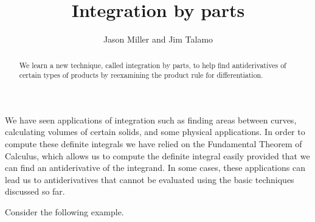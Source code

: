 \documentclass[noauthor]{ximera}
\author{Jason Miller and Jim Talamo}
\title[Dig-In:]{Integration by parts}
\begin{document}
\begin{abstract}
  We learn a new technique, called integration by parts, to help find antiderivatives of certain types of products by reexamining the product rule for differentiation.
\end{abstract}
\maketitle

We have seen applications of integration such as finding areas between curves, calculating volumes of certain solids, and some physical applications. In order to compute these definite integrals we have relied on the Fundamental Theorem of Calculus, which allows us to compute the definite integral easily provided that we can find an antiderivative of the integrand.  In some cases, these applications can lead us to antiderivatives that cannot be evaluated using the basic techniques discussed so far.

Consider the following example.
\end{document}
